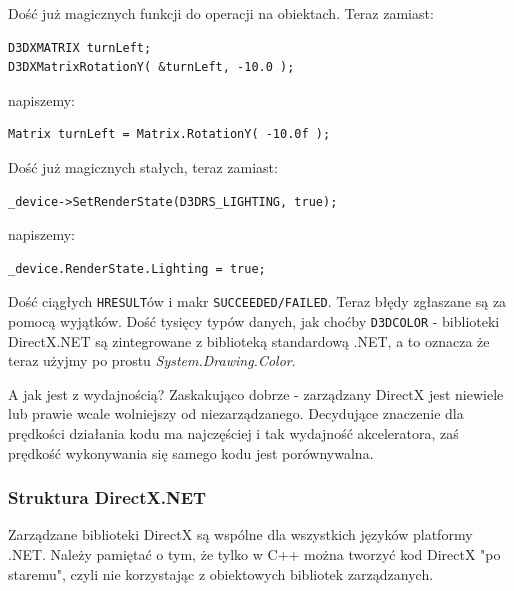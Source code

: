 Dość już magicznych funkcji do operacji na obiektach. Teraz zamiast:

\begin{scriptsize}
\begin{verbatim}
D3DXMATRIX turnLeft;
D3DXMatrixRotationY( &turnLeft, -10.0 );
\end{verbatim}
\end{scriptsize}

napiszemy:

\begin{scriptsize}
\begin{verbatim}
Matrix turnLeft = Matrix.RotationY( -10.0f );
\end{verbatim}
\end{scriptsize}

Dość już magicznych stałych, teraz zamiast:

\begin{scriptsize}
\begin{verbatim}
_device->SetRenderState(D3DRS_LIGHTING, true);
\end{verbatim}
\end{scriptsize}

napiszemy:

\begin{scriptsize}
\begin{verbatim}
_device.RenderState.Lighting = true;
\end{verbatim}
\end{scriptsize}

Dość ciągłych {\tt HRESULT}ów i makr {\tt SUCCEEDED/FAILED}. Teraz błędy zgłaszane są za pomocą wyjątków. 
Dość tysięcy typów danych, jak choćby {\tt D3DCOLOR} - biblioteki DirectX.NET są zintegrowane z biblioteką 
standardową .NET, a to oznacza że teraz użyjmy po prostu {\em System.Drawing.Color}. 

A jak jest z wydajnością? Zaskakująco dobrze - zarządzany DirectX jest niewiele lub prawie wcale 
wolniejszy od niezarządzanego. Decydujące znaczenie dla prędkości działania kodu ma najczęściej i tak 
wydajność akceleratora, zaś prędkość wykonywania się samego kodu jest porównywalna. 

\subsubsection{Struktura DirectX.NET}

Zarządzane biblioteki DirectX są wspólne dla wszystkich języków platformy .NET. 
Należy pamiętać o tym, że tylko w C++ można tworzyć kod DirectX "po staremu", czyli nie korzystając 
z obiektowych bibliotek zarządzanych.

